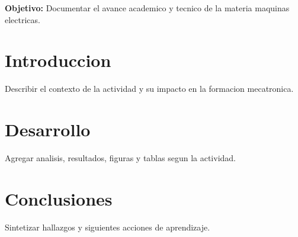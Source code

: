 \documentclass[spanish,letterpaper,oneside]{article}
\begin{document}
\templatePortrait
\templatePagecfg
\onehalfspacing

\begin{abstractd}
\textbf{Objetivo:} Documentar el avance academico y tecnico de la materia maquinas electricas.
\end{abstractd}

\templateIndex
\templateFinalcfg

\section{Introduccion}
Describir el contexto de la actividad y su impacto en la formacion mecatronica.

\section{Desarrollo}
Agregar analisis, resultados, figuras y tablas segun la actividad.

\section{Conclusiones}
Sintetizar hallazgos y siguientes acciones de aprendizaje.



\end{document}
